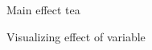 \documentclass{article}
\begin{document}
\begin{figure}[H]
  \caption{Main effect tea}
  \noindent{}
  \centering
\end{figure}

\begin{figure}[H]
  \caption{Visualizing effect of variable}
  \noindent{}
  \centering
\end{figure}
\end{document}
